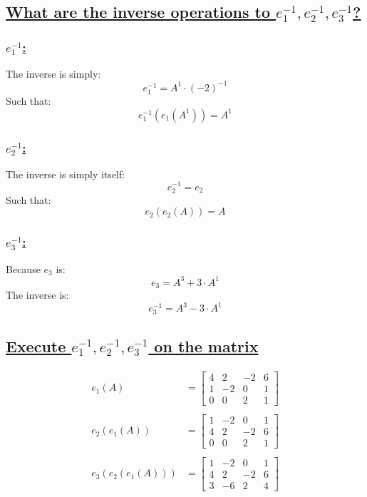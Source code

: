 \documentclass[a4paper, 12pt]{article}
\newcommand{\sub}[1]{\subsection{\underline{#1}}}
\newcommand{\subsub}[1]{\subsubsection{\underline{#1}}}
\newcommand{\?}{\stackrel{?}{=}}
\begin{document}
\section{}
\sub{What are the inverse operations to $e_{1}^{-1},e_{2}^{-1},e_{3}^{-1}$?}
\subsub{$e_{1}^{-1}$:}
The inverse is simply: $$ e_{1}^{-1} = A^1\cdot (-2)^{-1} $$
Such that: $$ e_{1}^{-1}(e_{1}(A^1)) = A^1 $$

\subsub{$e_{2}^{-1}$:}
The inverse is simply itself: $$ e_{2}^{-1} = e_{2} $$
Such that: $$ e_{2}(e_{2}(A)) = A $$

\subsub{$e_{3}^{-1}$:}
Because $e_{3}$ is: $$ e_{3} = A^3+3\cdot{A^1} $$
The inverse is: $$ e_{3}^{-1} = A^3-3\cdot{A^1} $$

\sub{Execute $e_{1}^{-1},e_{2}^{-1},e_{3}^{-1}$ on the matrix}
\begin{align*}
    e_1(A) &=
    \begin{bmatrix}
        4&2&-2&6\\
        1&-2&0&1\\
        0&0&2&1
    \end{bmatrix}
    \\\\e_2(e_1(A)) &=
    \begin{bmatrix}
        1&-2&0&1\\
        4&2&-2&6\\
        0&0&2&1
    \end{bmatrix}
    \\\\e_3(e_2(e_1(A))) &=
    \begin{bmatrix}
        1&-2&0&1\\
        4&2&-2&6\\
        3&-6&2&4
    \end{bmatrix}
\end{align*}
\pagebreak

\setcounter{section}{22}
\end{document}
